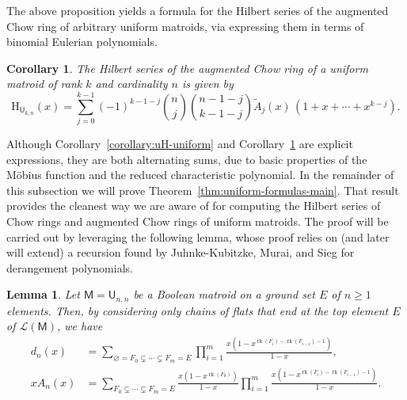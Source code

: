 \documentclass[11pt, a4paper, english]{amsart}
\theoremstyle{teoremas}
\newtheorem{corollary}[theorem]{Corollary}
\newtheorem{lemma}[theorem]{Lemma}
\theoremstyle{definition}
\DeclareMathOperator{\rk}{rk}
\newcommand{\M}{\mathsf{M}}
\newcommand{\U}{\mathsf{U}}
\renewcommand{\H}{\mathrm{H}}
\begin{document}
The above proposition yields a formula for the Hilbert series of the augmented Chow ring of arbitrary uniform matroids, via expressing them in terms of binomial Eulerian polynomials. 

\begin{corollary}\label{corollary:H-uniform}
    The Hilbert series of the augmented Chow ring of a uniform matroid of rank $k$ and cardinality $n$ is given by
    \[ \H_{\U_{k,n}}(x) = \sum_{j=0}^{k-1} (-1)^{k-1-j} \binom{n}{j} \binom{n-1-j}{k-1-j} \widetilde{A}_{j}(x)\, (1+x+\cdots+x^{k-j}).\]
\end{corollary}

Although Corollary~\ref{corollary:uH-uniform} and Corollary~\ref{corollary:H-uniform} are explicit expressions, they are both alternating sums, due to basic properties of the M\"obius function and the reduced characteristic polynomial. In the remainder of this subsection we will prove Theorem~\ref{thm:uniform-formulas-main}. That result provides the cleanest way we are aware of for computing the Hilbert series of Chow rings and augmented Chow rings of uniform matroids. The proof will be carried out by leveraging the following lemma, whose proof relies on (and later will extend) a recursion found by Juhnke-Kubitzke, Murai, and Sieg \cite{juhnke-murai-sieg} for derangement polynomials.

\begin{lemma}\label{lem:dn-and-An}
    Let $\M=\U_{n,n}$ be a Boolean matroid on a ground set $E$ of $n\geq 1$ elements. Then, by considering only chains of flats that end at the top element $E$ of $\mathcal{L}(\M)$, we have 
    \begin{align*}
         d_n(x) &= \sum_{\varnothing = F_0 \subsetneq \cdots \subsetneq F_m= E} \prod_{i=1}^m \frac{x ( 1 - x^{\rk(F_i)-\rk(F_{i-1})-1})}{1-x},\\
         xA_n(x) &= \sum_{F_0 \subsetneq \cdots \subsetneq F_m=E} \frac{x(1-x^{\rk(F_0)})}{1-x} \prod_{i=1}^m \frac{x(1- x^{\rk(F_i)-\rk(F_{i-1})-1})}{1-x}.
    \end{align*}
\end{lemma}
\end{document}
